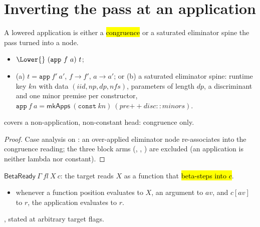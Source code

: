 \section{Inverting the pass at an application}
\label{sec:correctness:lowerinv}

\begin{lemma}
\label{lem:Lower-source_app}
\leanok
{}
 A lowered application is either a \hl{congruence} or a saturated eliminator spine the
pass turned into a  node.
\begin{itemize}
\item {} $\Lower{}\ (\mathtt{app}\ f\ a)\ t$;
\item {} (a) $t = \mathtt{app}\ f'\ a'$, $f\to f'$, $a\to a'$; or (b) a saturated eliminator
spine: runtime key $kn$ with  data $(iid, np, dp, nfs)$, parameters of length $dp$, a
discriminant and one minor premise per constructor, $\mathtt{app}\ f\ a =
\mathsf{mkApps}\ (\mathtt{const}\ kn)\ (pre \mathbin{+\!\!+} disc :: minors)$.
\end{itemize}
  covers a non-application, non-constant head: congruence only.
\end{lemma}
\begin{proof}
\leanok
{}
 Case analysis on \Lower{}: an over-applied eliminator node re-associates into the congruence
reading; the three block arms (, , ) are excluded (an
application is neither lambda nor constant).
\end{proof}

\begin{definition}
\label{def:BetaReady}
\leanok
{}
 $\mathsf{BetaReady}\ \Gamma\ fl\ X\ c$: the target reads $X$ as a function that
\hl{beta-steps into $c$}.
\begin{itemize}
\item whenever a function position evaluates to $X$, an argument to $av$, and $c[av]$ to $r$, the
application evaluates to $r$.
\end{itemize}
 , stated at arbitrary target flags.
\end{definition}


